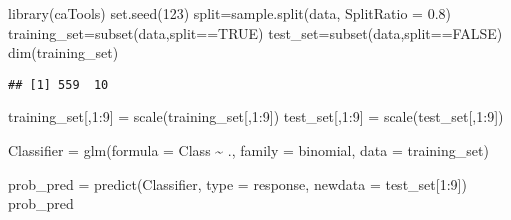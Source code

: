 \documentclass[
]{article}
\newenvironment{Shaded}{\begin{snugshade}}{\end{snugshade}}
\newcommand{\AttributeTok}[1]{\textcolor[rgb]{0.77,0.63,0.00}{#1}}
\newcommand{\ConstantTok}[1]{\textcolor[rgb]{0.00,0.00,0.00}{#1}}
\newcommand{\DecValTok}[1]{\textcolor[rgb]{0.00,0.00,0.81}{#1}}
\newcommand{\FloatTok}[1]{\textcolor[rgb]{0.00,0.00,0.81}{#1}}
\newcommand{\FunctionTok}[1]{\textcolor[rgb]{0.00,0.00,0.00}{#1}}
\newcommand{\NormalTok}[1]{#1}
\newcommand{\OtherTok}[1]{\textcolor[rgb]{0.56,0.35,0.01}{#1}}
\newcommand{\SpecialCharTok}[1]{\textcolor[rgb]{0.00,0.00,0.00}{#1}}
\newcommand{\StringTok}[1]{\textcolor[rgb]{0.31,0.60,0.02}{#1}}
\begin{document}
\begin{Shaded}
\begin{Highlighting}[]
\FunctionTok{library}\NormalTok{(caTools)}
\FunctionTok{set.seed}\NormalTok{(}\DecValTok{123}\NormalTok{)    }
\NormalTok{split}\OtherTok{=}\FunctionTok{sample.split}\NormalTok{(data, }\AttributeTok{SplitRatio =} \FloatTok{0.8}\NormalTok{)}
\NormalTok{training\_set}\OtherTok{=}\FunctionTok{subset}\NormalTok{(data,split}\SpecialCharTok{==}\ConstantTok{TRUE}\NormalTok{)}
\NormalTok{test\_set}\OtherTok{=}\FunctionTok{subset}\NormalTok{(data,split}\SpecialCharTok{==}\ConstantTok{FALSE}\NormalTok{)}
\FunctionTok{dim}\NormalTok{(training\_set) }
\end{Highlighting}
\end{Shaded}

\begin{verbatim}
## [1] 559  10
\end{verbatim}

\begin{Shaded}
\begin{Highlighting}[]
\NormalTok{training\_set[,}\DecValTok{1}\SpecialCharTok{:}\DecValTok{9}\NormalTok{] }\OtherTok{=} \FunctionTok{scale}\NormalTok{(training\_set[,}\DecValTok{1}\SpecialCharTok{:}\DecValTok{9}\NormalTok{])}
\NormalTok{test\_set[,}\DecValTok{1}\SpecialCharTok{:}\DecValTok{9}\NormalTok{] }\OtherTok{=} \FunctionTok{scale}\NormalTok{(test\_set[,}\DecValTok{1}\SpecialCharTok{:}\DecValTok{9}\NormalTok{])}
\end{Highlighting}
\end{Shaded}

\begin{Shaded}
\begin{Highlighting}[]
\NormalTok{Classifier }\OtherTok{=} \FunctionTok{glm}\NormalTok{(}\AttributeTok{formula =}\NormalTok{ Class }\SpecialCharTok{\textasciitilde{}}\NormalTok{ ., }
                 \AttributeTok{family =}\NormalTok{ binomial, }
                 \AttributeTok{data =}\NormalTok{ training\_set)}
\end{Highlighting}
\end{Shaded}

\begin{Shaded}
\begin{Highlighting}[]
\NormalTok{prob\_pred }\OtherTok{=} \FunctionTok{predict}\NormalTok{(Classifier, }\AttributeTok{type =} \StringTok{\textquotesingle{}response\textquotesingle{}}\NormalTok{, }\AttributeTok{newdata =}\NormalTok{ test\_set[}\DecValTok{1}\SpecialCharTok{:}\DecValTok{9}\NormalTok{])}
\NormalTok{prob\_pred}
\end{Highlighting}
\end{Shaded}
\end{document}
